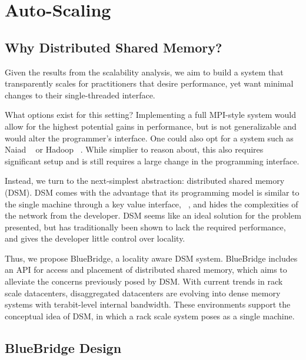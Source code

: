 \section{Auto-Scaling}
\label{sec:autoscaling}

\subsection{Why Distributed Shared Memory?}

Given the results from the scalability analysis, we aim to build a system that
transparently scales for practitioners that desire performance, yet want minimal
changes to their single-threaded interface.

What options exist for this setting? Implementing a full MPI-style system would
allow for the highest potential gains in performance, but is not generalizable
and would alter the programmer's interface. One could also opt for a system such
as Naiad ~\cite{Murray:2013:NTD:2517349.2522738} or Hadoop
~\cite{Vavilapalli:2013:AHY:2523616.2523633}. While simplier to reason about, 
this also requires significant setup and is still requires a large change in the 
programming interface. 

Instead, we turn to the next-simplest abstraction: distributed shared memory (DSM).
DSM comes with the advantage that its programming model is similar to the
single machine through a key value interface, ~\cite{Power:2010:PBF:1924943.1924964}, 
and hides the complexities of the network from the developer. DSM seems like an
ideal solution for the problem presented, but has traditionally been shown to lack
the required performance, and gives the developer little control over locality. 

Thus, we propose BlueBridge, a locality aware DSM system. BlueBridge includes
an API for access and placement of distributed shared memory, which aims to
alleviate the concerns previously posed by DSM. With current trends in rack
scale datacenters, disaggregated datacenters are evolving into dense memory
systems with terabit-level internal bandwidth. These environments support the 
conceptual idea of DSM, in which a rack scale system poses as a single machine. 

\subsection{BlueBridge Design}

